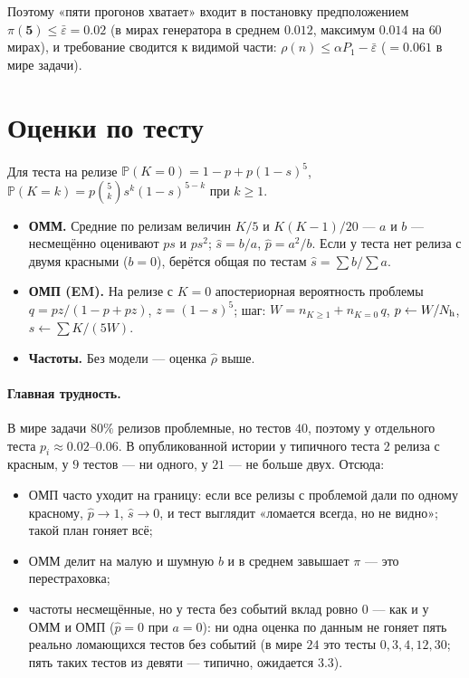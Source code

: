 \documentclass[11pt,a4paper]{article}
\newcommand{\Prob}{\mathbb{P}}
\theoremstyle{plain}
\theoremstyle{definition}
\begin{document}
Поэтому «пяти прогонов хватает» входит в постановку предположением $\pi(\mathbf5)\le\bar\varepsilon=0.02$ (в мирах генератора в среднем $0.012$, максимум $0.014$ на $60$ мирах), и требование сводится к видимой части: $\rho(n)\le\alpha P_1-\bar\varepsilon$ ($=0.061$ в мире задачи).

\section{Оценки по тесту}

Для теста на релизе $\Prob(K=0)=1-p+p(1-s)^5$, $\Prob(K=k)=p\binom5ks^k(1-s)^{5-k}$ при $k\ge1$.
\begin{itemize}
\item \textbf{ОММ.} Средние по релизам величин $K/5$ и $K(K-1)/20$ --- $a$ и $b$ --- несмещённо оценивают $ps$ и $ps^2$; $\hat s=b/a$, $\hat p=a^2/b$. Если у теста нет релиза с двумя красными ($b=0$), берётся общая по тестам $\hat s=\sum b/\sum a$.
\item \textbf{ОМП (EM).} На релизе с $K=0$ апостериорная вероятность проблемы $q=pz/(1-p+pz)$, $z=(1-s)^5$; шаг: $W=n_{K\ge1}+n_{K=0}\,q$, $p\leftarrow W/N_{\rm h}$, $s\leftarrow\sum K/(5W)$.
\item \textbf{Частоты.} Без модели --- оценка $\hat\rho$ выше.
\end{itemize}

\paragraph{Главная трудность.} В мире задачи $80\%$ релизов проблемные, но тестов $40$, поэтому у отдельного теста $p_i\approx0.02$--$0.06$. В опубликованной истории у типичного теста $2$ релиза с красным, у $9$ тестов --- ни одного, у $21$ --- не больше двух. Отсюда:
\begin{itemize}
\item ОМП часто уходит на границу: если все релизы с проблемой дали по одному красному, $\hat p\to1$, $\hat s\to0$, и тест выглядит «ломается всегда, но не видно»; такой план гоняет всё;
\item ОММ делит на малую и шумную $b$ и в среднем завышает $\pi$ --- это перестраховка;
\item частоты несмещённые, но у теста без событий вклад ровно $0$ --- как и у ОММ и ОМП ($\hat p=0$ при $a=0$): ни одна оценка по данным не гоняет пять реально ломающихся тестов без событий (в мире $24$ это тесты $0,3,4,12,30$; пять таких тестов из девяти --- типично, ожидается $3.3$).
\end{itemize}
\end{document}
